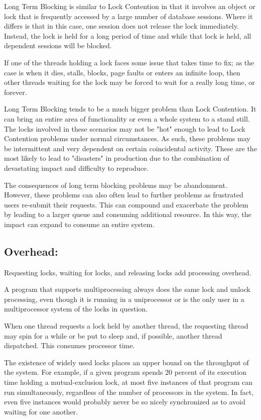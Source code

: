 \documentclass[a4paper]{article}
\begin{document}
Long Term Blocking is similar to Lock Contention in that it involves an object or lock that is frequently accessed by a large number of database sessions. Where it differs is that in this case, one session does not release the lock immediately. Instead, the lock is held for a long period of time and while that lock is held, all dependent sessions will be blocked.

If one of the threads holding a lock faces some issue that takes time to fix; as the case is when it dies, stalls, blocks, page faults or enters an infinite loop, then other threads waiting for the lock may be forced to wait for a really long time, or forever.

Long Term Blocking tends to be a much bigger problem than Lock Contention. It can bring an entire area of functionality or even a whole system to a stand still. The locks involved in these scenarios may not be "hot" enough to lead to Lock Contention problems under normal circumstances. As such, these problems may be intermittent and very dependent on certain coincidental activity. These are the most likely to lead to "disasters" in production due to the combination of devastating impact and difficulty to reproduce.

The consequences of long term blocking problems may be abandonment. However, these problems can also often lead to further problems as frustrated users re-submit their requests. This can compound and exacerbate the problem by leading to a larger queue and consuming additional resource. In this way, the impact can expand to consume an entire system.

\subsection{Overhead:}

Requesting locks, waiting for locks, and releasing locks add processing overhead.

    A program that supports multiprocessing always does the same lock and unlock processing, even though it is running in a uniprocessor or is the only user in a multiprocessor system of the locks in question.
    
    When one thread requests a lock held by another thread, the requesting thread may spin for a while or be put to sleep and, if possible, another thread dispatched. This consumes processor time.
    
    The existence of widely used locks places an upper bound on the throughput of the system. For example, if a given program spends 20 percent of its execution time holding a mutual-exclusion lock, at most five instances of that program can run simultaneously, regardless of the number of processors in the system. In fact, even five instances would probably never be so nicely synchronized as to avoid waiting for one another.
    
\end{document}
